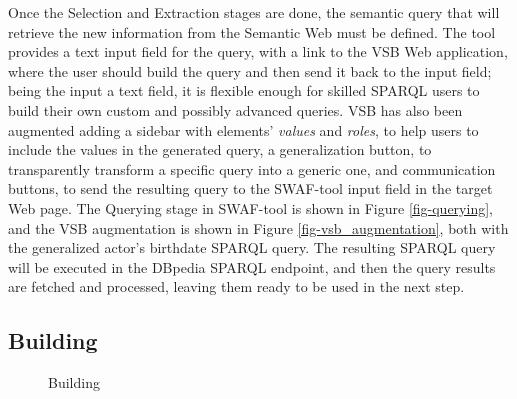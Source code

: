 \documentclass[runningheads]{llncs}
\begin{document}
Once the Selection and Extraction stages are done, the semantic query that will retrieve the new information from the Semantic Web must be defined. The tool provides a text input field for the query, with a link to the VSB Web application, where the user should build the query and then send it back to the input field; being the input a text field, it is flexible enough for skilled SPARQL users to build their own custom and possibly advanced queries. VSB has also been augmented adding a sidebar with elements' \emph{values} and \emph{roles}, to help users to include the values in the generated query, a generalization button, to transparently transform a specific query into a generic one, and communication buttons, to send the resulting query to the SWAF-tool input field in the target Web page. The Querying stage in SWAF-tool is shown in Figure \ref{fig-querying}, and the VSB augmentation is shown in Figure \ref{fig-vsb_augmentation}, both with the generalized actor's birthdate SPARQL query. The resulting SPARQL query will be executed in the DBpedia SPARQL endpoint, and then the query results are fetched and processed, leaving them ready to be used in the next step.

\subsection{Building}


\begin{figure}
  \centering
    \caption{Building}
    \label{fig-building}
\end{figure}
\end{document}
